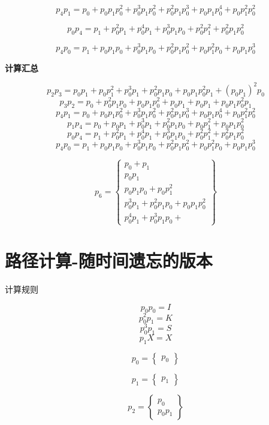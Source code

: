 \documentclass[a4paper,12pt]{article}
\numberwithin{definition}{section}
\numberwithin{lemma}{section}
\numberwithin{proposition}{section}
\numberwithin{theorem}{section}
\numberwithin{grammar}{section}
\numberwithin{program}{section}
\numberwithin{convention}{section}
\numberwithin{corollary}{section}
\numberwithin{principle}{section}
\begin{document}
$$p_4 p_1 = p_0 + p_0 p_1 p_0^2 + p_0^3 p_1 p_0^2 + p_0^2 p_1 p_0^3 + p_0 p_1 p_0^4 + p_0 p_1^2 p_0^2$$

$$p_0 p_4 = p_1 + p_0^2 p_1 + p_0^4 p_1 + p_0^3 p_1 p_0 + p_0^2 p_1^2 + p_0^2 p_1 p_0^2 $$

$$p_4 p_0 = p_1 + p_0 p_1 p_0 + p_0^3 p_1 p_0 + p_0^2 p_1 p_0^2 + p_0 p_1^2 p_0 + p_0 p_1 p_0^3$$

\textbf{计算汇总}

$$p_2 p_3 = p_0 p_1 + p_0 p_1^2 + p_0^3 p_1 + p_0^2 p_1 p_0 + p_0 p_1 p_0^2 p_1 + (p_0 p_1)^2 p_0$$
$$p_3 p_2 = p_0 + p_0^2 p_1 p_0 + p_0 p_1 p_0^2 + p_0 p_1 + p_0 p_1 + p_0 p_1 p_0^2 p_1 $$
$$p_4 p_1 = p_0 + p_0 p_1 p_0^2 + p_0^3 p_1 p_0^2 + p_0^2 p_1 p_0^3 + p_0 p_1 p_0^4 + p_0 p_1^2 p_0^2$$
$$p_1 p_4 = p_0 + p_0 p_1 + p_0^3 p_1 + p_0^2 p_1 p_0 + p_0 p_1^2 + p_0 p_1 p_0^2$$
$$p_0 p_4 = p_1 + p_0^2 p_1 + p_0^4 p_1 + p_0^3 p_1 p_0 + p_0^2 p_1^2 + p_0^2 p_1 p_0^2 $$
$$p_4 p_0 = p_1 + p_0 p_1 p_0 + p_0^3 p_1 p_0 + p_0^2 p_1 p_0^2 + p_0 p_1^2 p_0 + p_0 p_1 p_0^3$$

$$
p_6 = \begin{Bmatrix}
    p_0 + p_1 \\
    p_0 p_1 \\
    p_0 p_1 p_0 + p_0 p_1^2 \\
    p_0^3 p_1 + p_0^2 p_1 p_0 + p_0 p_1 p_0^2\\
    p_0^4 p_1 + p_0^3 p_1 p_0 +
\end{Bmatrix}
$$

\section{路径计算-随时间遗忘的版本}

计算规则

$$p_0 p_0 = I$$
$$p_0^2 p_1 = K$$
$$p_0^3 p_1 = S$$
$$p_1 X = X$$

$$p_0 = \begin{Bmatrix} p_0 \end{Bmatrix}$$

$$p_1 = \begin{Bmatrix} p_1 \end{Bmatrix}$$

$$p_2 = \begin{Bmatrix}  p_0 \\  p_0 p_1 \end{Bmatrix}$$
\end{document}
